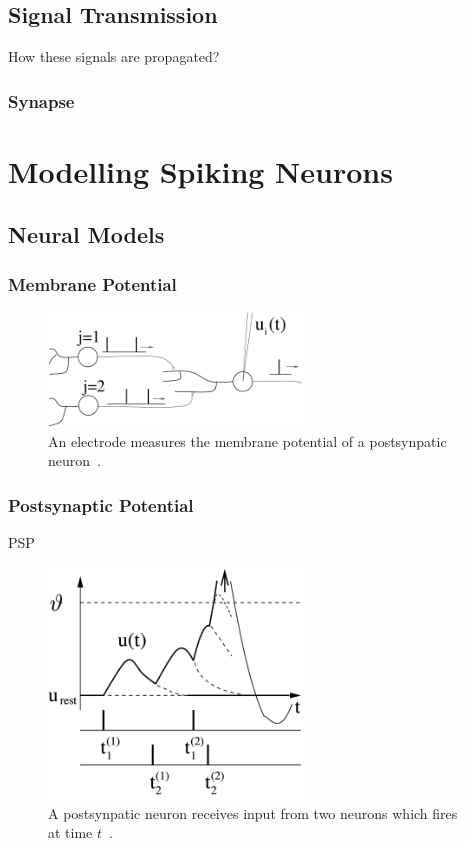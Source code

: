 \subsection{Signal Transmission}
How these signals are propagated? 
\subsubsection{Synapse}




\section{Modelling Spiking Neurons}
\label{sec:spike}
\subsection{Neural Models}
\subsubsection{Membrane Potential}
\begin{figure}[bt]
	\centering
	\includegraphics[width=0.6\textwidth]{pics_snn/x10.png}
	\caption{An electrode measures the membrane potential of a postsynpatic neuron~\cite{gerstner2014neuronal}.}
	\label{Fig:mem_potential}
\end{figure}

\subsubsection{Postsynaptic Potential}
PSP
\begin{figure}[bt]
	\centering
	\includegraphics[width=0.6\textwidth]{pics_snn/x11.png}
	\caption{A postsynpatic neuron receives input from two neurons which fires at time $t$~\cite{gerstner2014neuronal}.}
	\label{Fig:psp}
\end{figure}

